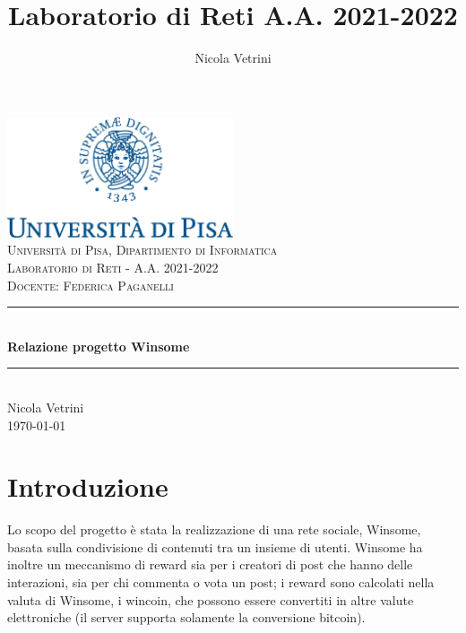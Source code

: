 \documentclass[a4paper,11pt]{article}
\author{Nicola Vetrini}
\title{Laboratorio di Reti A.A. 2021-2022}
\newcommand{\HRule}{\rule{\linewidth}{0.5mm}} 	%
\begin{document}
	\begin{titlepage}
		\center
		\includegraphics[width=0.5\textwidth]{img/unipi-logo.png}\\[1cm]
		
		\textsc{\Large Università di Pisa, Dipartimento di Informatica}\\[1cm]
		
		\textsc{\Large Laboratorio di Reti - A.A. 2021-2022}\\[0.2cm]
		\textsc{\large Docente: Federica Paganelli}\\[1cm]
		
		\HRule \\[0.8cm]
		{ \Large \bfseries Relazione progetto Winsome}\\[0.7cm]
		\HRule \\[2cm]
		
		\large Nicola Vetrini\\[0.cm]
		{\large \today}\\[5cm]
		
		\vfill
		\end{titlepage}

	\newpage
	\tableofcontents
	
	\newpage
	
	\section{Introduzione}
	
	Lo scopo del progetto è stata la realizzazione di una rete sociale, Winsome, basata sulla condivisione
	di contenuti tra un insieme di utenti. Winsome ha inoltre un meccanismo di reward sia per i creatori
	di post che hanno delle interazioni, sia per chi commenta o vota un post; i reward sono calcolati
	nella valuta di Winsome, i wincoin, che possono essere convertiti in altre valute elettroniche
	(il server supporta solamente la conversione bitcoin).
	
	
	
	
	
	
\end{document}
